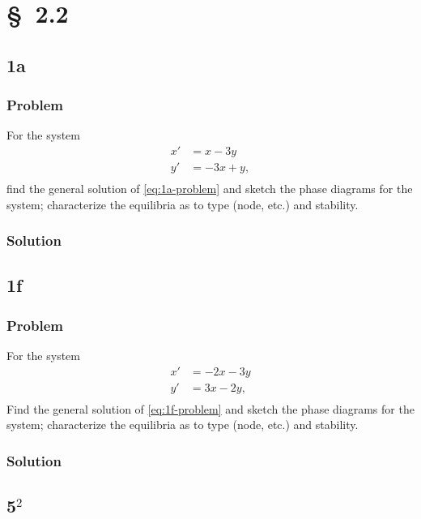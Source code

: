 \documentclass[12pt]{article}
\begin{document}
\section{\S~2.2}
\subsection{1a}
\subsubsection*{Problem}
For the system
\begin{equation}
  \label{eq:1a-problem}
  \begin{aligned}
    x'&=x-3y\\
    y'&=-3x+y,\\
  \end{aligned}
\end{equation}
find the general solution of \cref{eq:1a-problem} and sketch the phase diagrams
for the system; characterize the equilibria as to type (node, etc.) and
stability.
\subsubsection*{Solution}
\todo[]

\subsection{1f}
\subsubsection*{Problem}
For the system
\begin{equation}
  \label{eq:1f-problem}
  \begin{aligned}
    x'&=-2x-3y\\
    y'&=3x-2y,\\
  \end{aligned}
\end{equation}
Find the general solution of \cref{eq:1f-problem} and sketch the phase diagrams
for the system; characterize the equilibria as to type (node, etc.) and
stability.
\subsubsection*{Solution} \todo[]

\subsection{5$^2$}
\end{document}
